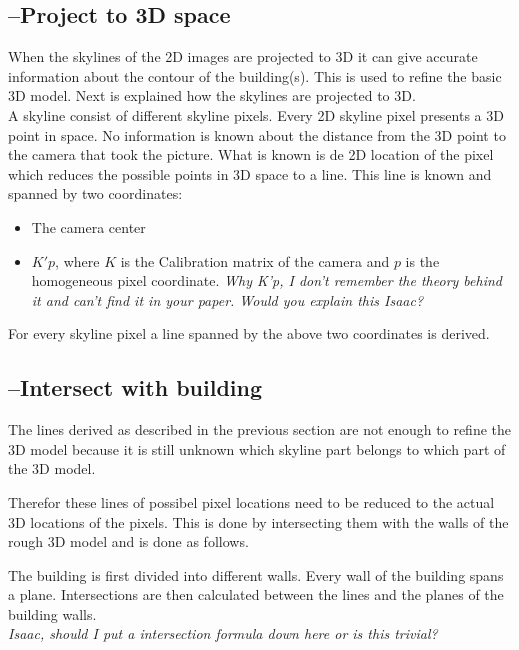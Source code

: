 \subsection{--Project to 3D space}
When the skylines of the 2D images are projected to 3D it can give 
accurate information about the contour of the building(s). This is used to
refine the basic 3D model.  Next is explained how the skylines are projected to
3D.\\

A skyline consist of different skyline pixels. Every 2D skyline pixel presents a 3D point in space. No
information is known about the distance from the 3D point to the camera that
took the picture. What is known is de 2D location of the pixel which reduces the possible points in 3D
space to a line.  This line is known and spanned by two 
coordinates:\\ 
\begin{itemize}
	\item The camera center %
	\item $K'p$, where $K$ is the Calibration matrix of the camera and $p$ is the homogeneous pixel coordinate.
	\textit{Why K'p, I don't remember the theory behind it and can't find it in your paper. Would you explain this Isaac?}
\end{itemize}


For every skyline pixel a line spanned by the above two coordinates is derived.


\subsection{--Intersect with building}
The lines derived as described in the previous section are not enough to refine
the 3D model because it is still unknown which skyline part belongs to which
part of the 3D model.

Therefor these lines of possibel pixel locations need to
be reduced to the actual 3D locations of the pixels.  This is done by intersecting
them with the walls of the rough 3D model and is done as follows.

The building is first divided into different walls.  Every wall of the building spans a plane. 
Intersections are then calculated between the lines and the planes of the building walls.\\
\textit{Isaac, should I put a intersection formula down here or is this trivial?}\\

